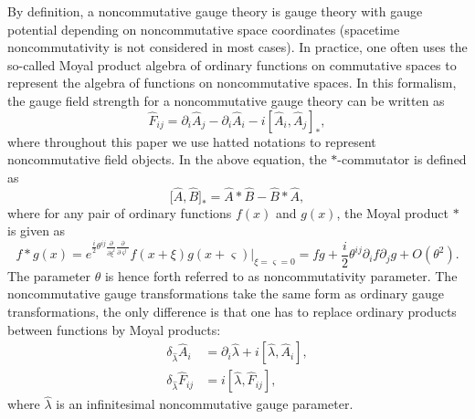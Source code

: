 \documentclass[a4paper,a4paper]{article}%
\begin{document}
By definition, a noncommutative gauge theory is gauge theory with gauge
potential depending on noncommutative space coordinates (spacetime
noncommutativity is not considered in most cases). In practice, one often uses
the so-called Moyal product algebra of ordinary functions on commutative
spaces to represent the algebra of functions on noncommutative spaces. In this
formalism, the gauge field strength for a noncommutative gauge theory can be
written as%
\[
\hat{F}_{ij}=\partial_{i}\hat{A}_{j}-\partial_{i}\hat{A}_{i}-i[\hat{A}_{i}%
,\hat{A}_{j}]_{\ast},
\]
where throughout this paper we use hatted notations to represent
noncommutative field objects. In the above equation, the $\ast$-commutator is
defined as%
\[
\lbrack\hat{A},\hat{B}]_{\ast}=\hat{A}\ast\hat{B}-\hat{B}\ast\hat{A},
\]
where for any pair of ordinary functions $f(x)$ and $g(x)$, the Moyal product
$\ast$ is given as\cite{14}%
\[
f\ast g(x)=e^{\frac{i}{2}\theta^{ij}\frac{\partial}{\partial\xi^{i}}%
\frac{\partial}{\partial\varsigma^{j}}}f(x+\xi)g(x+\varsigma)|_{\xi
=\varsigma=0}=fg+\frac{i}{2}\theta^{ij}\partial_{i}f\partial_{j}g+O(\theta
^{2}).
\]
The parameter $\theta$ is hence forth referred to as noncommutativity
parameter. The noncommutative gauge transformations take the same form as
ordinary gauge transformations, the only difference is that one has to replace
ordinary products between functions by Moyal products:%
\begin{align}
\delta_{\hat{\lambda}}\hat{A}_{i}  &  =\partial_{i}\hat{\lambda}%
+i[\hat{\lambda},\hat{A}_{i}],\nonumber\\
\delta_{\hat{\lambda}}\hat{F}_{ij}  &  =i[\hat{\lambda},\hat{F}_{ij}],
\label{gaugefield}%
\end{align}
where $\hat{\lambda}$ is an infinitesimal noncommutative gauge parameter.
\end{document}
